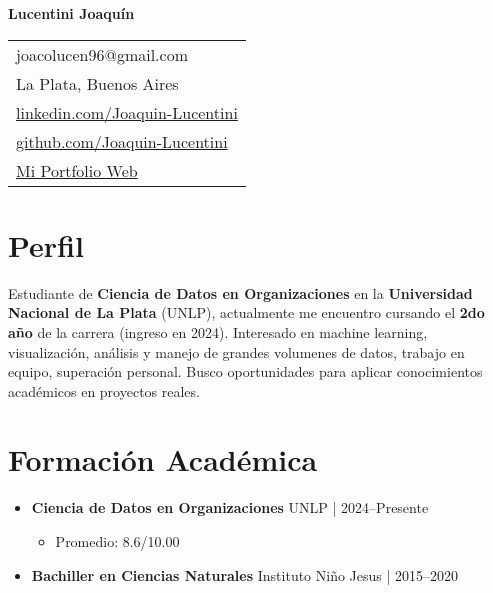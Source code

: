 \documentclass[11pt, a4paper]{article}
\newcommand{\cvitem}[2]{\textbf{#1} \hfill \color{secondary}#2} %
\begin{document}
\begin{center}
    {\Huge \textbf{Lucentini Joaquín}} \\[15pt]
    
    \noindent
    \begin{tabular}{@{} l @{}}
    \faEnvelope{} joacolucen96@gmail.com \\
    \faMapMarker{} La Plata, Buenos Aires \\
    \faLinkedin{} \href{https://www.linkedin.com/in/joaquin-lucentini-a48066277/}{linkedin.com/Joaquin-Lucentini} \\
    \faGithub{} \href{https://github.com/JoacoLucen}{github.com/Joaquin-Lucentini}\\
    \faGlobe{} \href{https://joacolucen.github.io/Joaquin-Lucentini-Portfolio/}{Mi Portfolio Web}
    \end{tabular}
\end{center}

\section*{Perfil}
Estudiante de \textbf{Ciencia de Datos en Organizaciones} en la \textbf{Universidad Nacional de La Plata} (UNLP), actualmente me encuentro cursando el \textbf{2do año} de la carrera (ingreso en 2024). Interesado en machine learning, visualización, análisis y manejo de grandes volumenes de datos, trabajo en equipo, superación personal. Busco oportunidades para aplicar conocimientos académicos en proyectos reales.

\section*{Formación Académica}
\begin{itemize}[leftmargin=*]
    \item \cvitem{Ciencia de Datos en Organizaciones}{UNLP | 2024--Presente}
    \begin{itemize}
        \item Promedio: 8.6/10.00
    \end{itemize}
    \item \cvitem{Bachiller en Ciencias Naturales}{Instituto Niño Jesus | 2015--2020}
\end{itemize}

\end{document}
